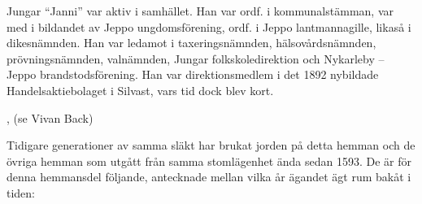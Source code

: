 Jungar ``Janni'' var aktiv i samhället. Han var ordf. i kommunalstämman, var med i bildandet av Jeppo ungdomsförening, ordf.  i Jeppo lantmannagille, likaså i dikesnämnden. Han var ledamot i taxeringsnämnden, hälsovårdsnämnden, prövningsnämnden, valnämnden, Jungar folkskoledirektion och Nykarleby – Jeppo brandstodsförening. Han var direktionsmedlem i det 1892 nybildade Handelsaktiebolaget i Silvast, vars tid dock blev kort.
\begin{jhchildren}
  \item {}
  \item {}
  \item {}
  \item {}
  \item {}
  \item {}
  \item {}, (se Vivan Back)
  \item {}
  \item {}
  \item {}
  \item {}
\end{jhchildren}

Tidigare generationer av samma släkt har brukat jorden på detta hemman och de övriga hemman som utgått från samma stomlägenhet ända sedan 1593. De är för denna hemmansdel följande, antecknade mellan vilka år ägandet ägt rum bakåt i tiden:


